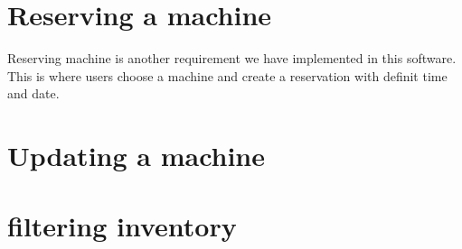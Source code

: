 \section*{Reserving a machine}
Reserving machine is another requirement we have implemented in this software. This is where users choose a machine and create a reservation with definit time and date. 
\section*{Updating a machine}
\section*{filtering inventory}


